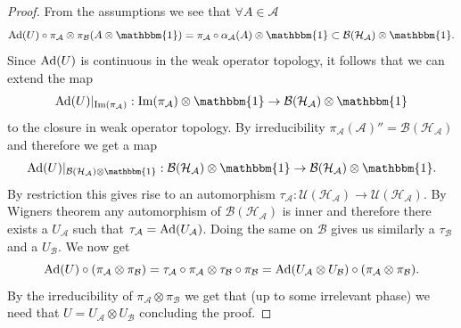 \documentclass[12pt,a4paper,twoside]{article}
\let\originalleft\left
\let\originalright\right
\renewcommand{\left}{\mathopen{}\mathclose\bgroup\originalleft}
\renewcommand{\right}{\aftergroup\egroup\originalright}
\newcommand{\UU}{\mathcal U}
\newcommand{\BB}{\mathcal B}
\newcommand{\HH}{\mathcal H}
\renewcommand{\AA}{\mathcal A}
\newcommand{\id}{\mathbbm{1}}
\newcommand{\Ad}[1]{\textrm{Ad}\left(#1\right)}
\theoremstyle{definition}
\numberwithin{equation}{section}
\begin{document}
\begin{proof}
From the assumptions we see that $\forall A\in\AA$
\begin{equation}
	\Ad{U}\circ\pi_\AA\otimes\pi_\BB(A\otimes\id)=\pi_\AA\circ\alpha_\AA(A)\otimes\id\subset \BB(\HH_\AA)\otimes\id.
\end{equation}
Since $\Ad{U}$ is continuous in the weak operator topology, it follows that we can extend the map
\begin{equation}
	\Ad{U}|_{\textrm{Im}(\pi_\AA)}:\textrm{Im}(\pi_\AA)\otimes\id\rightarrow \BB(\HH_\AA)\otimes\id
\end{equation}
to the closure in weak operator topology. By irreducibility $\pi_\AA(\AA)''=\BB(\HH_\AA)$ and therefore we get a map
\begin{equation}
	\Ad{U}|_{\BB(\HH_\AA)\otimes\id}:\BB(\HH_\AA)\otimes\id\rightarrow \BB(\HH_\AA)\otimes\id.
\end{equation}
By restriction this gives rise to an automorphism $\tau_\AA:\UU(\HH_\AA)\rightarrow\UU(\HH_\AA)$. By Wigners theorem any automorphism of $\BB(\HH_\AA)$ is inner and therefore there exists a $U_\AA$ such that $\tau_\AA=\Ad{U_\AA}$. Doing the same on $\BB$ gives us similarly a $\tau_\BB$ and a $U_\BB$. We now get
\begin{equation}
	\Ad{U}\circ(\pi_\AA\otimes\pi_\BB)=\tau_\AA\circ\pi_\AA\otimes\tau_\BB\circ\pi_\BB=\Ad{U_\AA\otimes U_\BB}\circ(\pi_\AA\otimes\pi_\BB).
\end{equation}
By the irreducibility of $\pi_\AA\otimes\pi_\BB$ we get that (up to some irrelevant phase) we need that $U=U_\AA\otimes U_\BB$ concluding the proof.
\end{proof}
\end{document}
